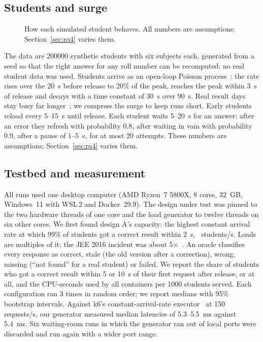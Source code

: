 \subsection{Students and surge}

\begin{figure}[t]
\centering

\caption{How each simulated student behaves. All numbers are assumptions;
Section~\ref{sec:rq4} varies them.}
\label{fig:student}
\end{figure}

The data are \num{200000} synthetic students with six subjects each,
generated from a seed so that the right answer for any roll number can be
recomputed; no real student data was used. Students arrive as an open-loop
Poisson process~\cite{schroeder2006open}: the rate rises over the \SI{20}{s}
before release to 20\% of the peak, reaches the peak within \SI{3}{s} of
release and decays with a time constant of \SI{30}{s} over \SI{90}{s}. Real
result days stay busy far longer~\cite{ht2021ssc}; we compress the surge to
keep runs short. Early students reload every 5--\SI{15}{s} until release. Each
student waits 5--\SI{20}{s} for an answer; after an error they refresh with
probability 0.8, after waiting in vain with probability 0.9, after a pause of
1--\SI{5}{s}, for at most 20 attempts. These numbers are assumptions;
Section~\ref{sec:rq4} varies them.

\subsection{Testbed and measurement}

All runs used one desktop computer (AMD Ryzen~7 5800X, 8 cores, \SI{32}{GB},
Windows~11 with WSL\,2 and Docker~29.9). The design under test was pinned to
the two hardware threads of one core and the load generator to twelve threads
on six other cores. We first found design A's capacity: the highest constant
arrival rate at which 99\% of students got a correct result within
\SI{2}{s}, \CapA\ students/s. Loads are multiples of it; the JEE 2016
incident was about 5$\times$~\cite{pagalguy2016jee}. An oracle classifies every
response as correct, stale (the old version after a correction), wrong,
missing (``not found'' for a real student) or failed. We report the share of
students who got a correct result within 5 or \SI{10}{s} of their first
request after release, or at all, and the CPU-seconds used by all containers
per \num{1000} students served. Each configuration ran 3 times in random
order; we report medians with 95\% bootstrap intervals. Against k6's
constant-arrival-rate executor~\cite{k6docs} at 150 requests/s, our generator
measured median latencies of 5.3--\SI{5.5}{ms} against \SI{5.4}{ms}. Six
waiting-room runs in which the generator ran out of local ports were discarded
and run again with a wider port range.
